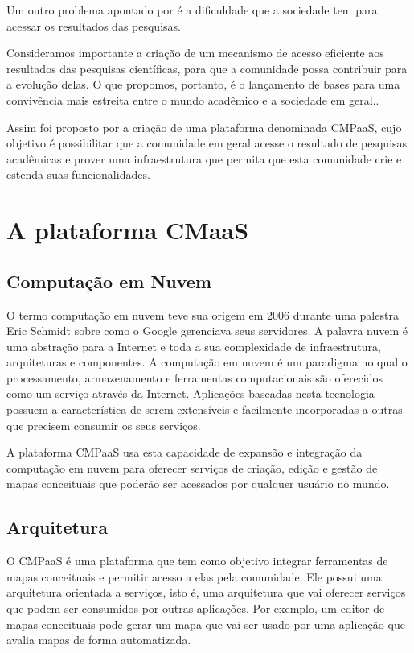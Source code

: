 \documentclass[
	12pt,				%
	openright,			%
	oneside,			%
	a4paper,			%
	english,			%
	french,				%
	spanish,			%
	brazil				%
	]{abntex2}
\begin{document}
Um outro problema apontado por  é a dificuldade que a sociedade tem para acessar os resultados das pesquisas.
\begin{citacao}
	Consideramos importante a criação de um mecanismo de
	acesso eficiente aos resultados das pesquisas científicas, para que a comunidade possa contribuir para a evolução delas. O que propomos, portanto, é o lançamento de bases para uma convivência mais estreita entre o mundo acadêmico e a sociedade em geral.\cite{Perin2014}.
\end{citacao}

Assim foi proposto por  a criação de uma plataforma denominada CMPaaS, cujo objetivo é possibilitar que a comunidade em geral acesse o resultado de pesquisas acadêmicas e prover uma infraestrutura que permita que esta comunidade crie e estenda suas funcionalidades.

\section{A plataforma CMaaS}

\subsection{Computação em Nuvem}

O termo computação em nuvem teve sua origem em 2006 durante uma palestra Eric Schmidt sobre como o Google gerenciava seus servidores\cite{taurion2009}. A palavra nuvem é uma abstração para a Internet e toda a sua complexidade de infraestrutura, arquiteturas e componentes. A computação em nuvem é um paradigma no qual o processamento, armazenamento e ferramentas computacionais são oferecidos como um serviço através da Internet. Aplicações baseadas nesta tecnologia possuem a característica de serem extensíveis e facilmente incorporadas a outras que precisem consumir os seus serviços\cite{Perin2014}.

A plataforma CMPaaS usa esta capacidade de expansão e integração da computação em nuvem para oferecer serviços de criação, edição e gestão de mapas conceituais que poderão ser acessados por qualquer usuário no mundo.

\subsection{Arquitetura}

O CMPaaS é uma plataforma que tem como objetivo integrar ferramentas de mapas conceituais e permitir acesso a elas pela comunidade. Ele possui uma arquitetura orientada a serviços, isto é, uma arquitetura que vai oferecer serviços que podem ser consumidos por outras aplicações. Por exemplo, um editor de mapas conceituais pode gerar um mapa que vai ser usado por uma aplicação que avalia mapas de forma automatizada.
\end{document}
